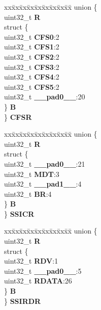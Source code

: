 \begin{DoxyCompactItemize}
\begin{tabbing}
\end{tabbing}\item 
\mbox{\label{structEQADC__tag_a7ef73ef13a33fadaf0b3d710cb4b9d6b}} 
\begin{tabbing}
xx\=xx\=xx\=xx\=xx\=xx\=xx\=xx\=xx\=\kill
union \{\\
\>uint32\_t {\bfseries R}\\
\>struct \{\\
\>\>uint32\_t {\bfseries CFS0}:2\\
\>\>uint32\_t {\bfseries CFS1}:2\\
\>\>uint32\_t {\bfseries CFS2}:2\\
\>\>uint32\_t {\bfseries CFS3}:2\\
\>\>uint32\_t {\bfseries CFS4}:2\\
\>\>uint32\_t {\bfseries CFS5}:2\\
\>\>uint32\_t {\bfseries \_\_pad0\_\_}:20\\
\>\} {\bfseries B}\\
\} {\bfseries CFSR}\\

\end{tabbing}\item 
\mbox{\label{structEQADC__tag_a4c8a6a3110cda224451a27af4afc568d}} 
\begin{tabbing}
xx\=xx\=xx\=xx\=xx\=xx\=xx\=xx\=xx\=\kill
union \{\\
\>uint32\_t {\bfseries R}\\
\>struct \{\\
\>\>uint32\_t {\bfseries \_\_pad0\_\_}:21\\
\>\>uint32\_t {\bfseries MDT}:3\\
\>\>uint32\_t {\bfseries \_\_pad1\_\_}:4\\
\>\>uint32\_t {\bfseries BR}:4\\
\>\} {\bfseries B}\\
\} {\bfseries SSICR}\\

\end{tabbing}\item 
\mbox{\label{structEQADC__tag_a866e03d2e80c242e77aa4f96920e2f56}} 
\begin{tabbing}
xx\=xx\=xx\=xx\=xx\=xx\=xx\=xx\=xx\=\kill
union \{\\
\>uint32\_t {\bfseries R}\\
\>struct \{\\
\>\>uint32\_t {\bfseries RDV}:1\\
\>\>uint32\_t {\bfseries \_\_pad0\_\_}:5\\
\>\>uint32\_t {\bfseries RDATA}:26\\
\>\} {\bfseries B}\\
\} {\bfseries SSIRDR}\\


\end{tabbing}
\end{DoxyCompactItemize}
